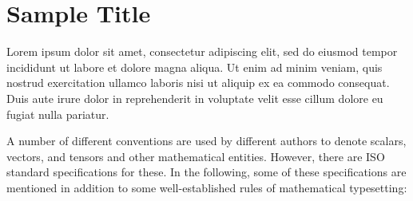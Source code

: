 \chapter{Sample Title}

Lorem ipsum dolor sit amet, consectetur adipiscing elit, sed do eiusmod tempor incididunt ut labore et dolore magna aliqua. Ut enim ad minim veniam, quis nostrud exercitation ullamco laboris nisi ut aliquip ex ea commodo consequat. Duis aute irure dolor in reprehenderit in voluptate velit esse cillum dolore eu fugiat nulla pariatur.


A number of different conventions are used by different authors to denote scalars, vectors, and tensors and other mathematical entities. However, there are ISO standard specifications for these. In the following, some of these specifications are mentioned in addition to some well-established rules of mathematical typesetting:

